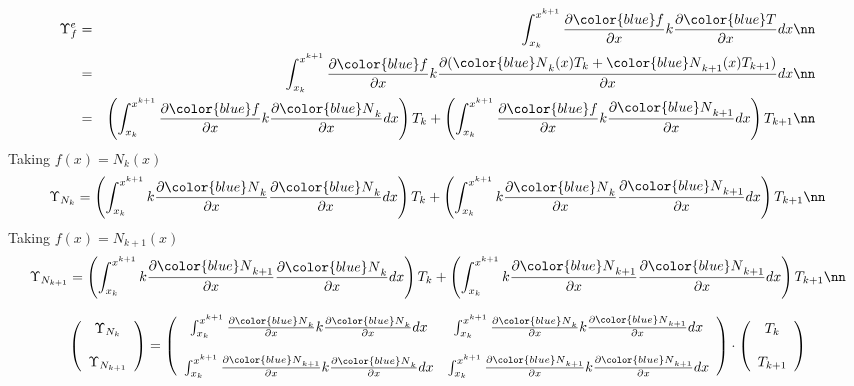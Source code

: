 \begin{eqnarray}
{\Upsilon}_f^e &=&
\int_{x_k}^{x^{k+1}} \frac{\partial {\color{blue}f}}{\partial x} k \frac{\partial {\color{blue}T}}{\partial x} dx \nn\\
&=&
\int_{x_k}^{x^{k+1}} \frac{\partial {\color{blue}f}}{\partial x} k \frac{\partial  ({\color{blue}N}_{k}(x) T_k + {\color{blue}N}_{k+1}(x) T_{k+1} ) }{\partial x} dx  \nn\\
&=&
\left( \int_{x_k}^{x^{k+1}} \frac{\partial {\color{blue}f}}{\partial x}  k \frac{\partial  {\color{blue}N}_{k} } {\partial x}  dx \right)  T_k 
+ \left( \int_{x_k}^{x^{k+1}} \frac{\partial {\color{blue}f}}{\partial x}  k \frac{\partial  {\color{blue}N}_{k+1} } {\partial x} dx \right) T_{k+1}  \nn
\end{eqnarray}
Taking $f(x)=N_k(x)$ 
\[
{\Upsilon}_{N_k}=
\left( \int_{x_k}^{x^{k+1}} k\frac{\partial {\color{blue}N}_k}{\partial x}  \frac{\partial  {\color{blue}N}_{k} } {\partial x}  dx \right)  T_k 
+ \left( \int_{x_k}^{x^{k+1}} k \frac{\partial {\color{blue}N}_k}{\partial x}  \frac{\partial  {\color{blue}N}_{k+1} } {\partial x} dx \right) T_{k+1}  \nn
\]
Taking $f(x)=N_{k+1}(x)$ 
\[
{\Upsilon}_{N_{k+1}}=
\left( \int_{x_k}^{x^{k+1}} k\frac{\partial {\color{blue}N}_{k+1}}{\partial x}  \frac{\partial  {\color{blue}N}_{k} } {\partial x}  dx \right)  T_k 
+ \left( \int_{x_k}^{x^{k+1}}  k\frac{\partial {\color{blue}N}_{k+1}}{\partial x}  \frac{\partial  {\color{blue}N}_{k+1} } {\partial x} dx \right) T_{k+1}  \nn
\]


\[
\left(
\begin{array}{cc}
 {\Upsilon}_{N_k} \\ \\ {\Upsilon}_{N_{k+1}}
\end{array}
\right)
=
\left(
\begin{array}{cc}
\int_{x_k}^{x^{k+1}} \frac{\partial {\color{blue}N}_k}{\partial x} k \frac{\partial  {\color{blue}N}_{k} } {\partial x}  dx & 
\int_{x_k}^{x^{k+1}} \frac{\partial {\color{blue}N}_k}{\partial x} k \frac{\partial  {\color{blue}N}_{k+1} } {\partial x} dx 
\\ \\
\int_{x_k}^{x^{k+1}} \frac{\partial {\color{blue}N}_{k+1}}{\partial x} k \frac{\partial  {\color{blue}N}_{k} } {\partial x}  dx & 
\int_{x_k}^{x^{k+1}} \frac{\partial {\color{blue}N}_{k+1}}{\partial x} k \frac{\partial  {\color{blue}N}_{k+1} } {\partial x} dx 
\end{array}
\right)
\cdot
\left(
\begin{array}{c}
T_k \\ \\ T_{k+1}
\end{array}
\right)
\]

